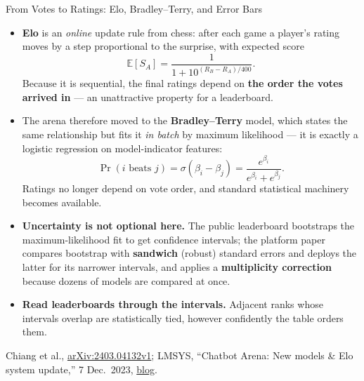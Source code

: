 \begin{frame}{From Votes to Ratings: Elo, Bradley--Terry, and Error Bars}
  \begin{itemize}\footnotesize\itemsep0.3em
    \item[\textcolor{red}{$\blacktriangleright$}] \textbf{Elo} is an \textit{online} update rule from chess: after each game a player's rating moves by a step proportional to the surprise, with expected score
      \[
        \mathbb{E}[S_A] = \frac{1}{1 + 10^{(R_B - R_A)/400}}.
      \]
      Because it is sequential, the final ratings depend on \textbf{the order the votes arrived in} --- an unattractive property for a leaderboard.
    \item[\textcolor{red}{$\blacktriangleright$}] The arena therefore moved to the \textbf{Bradley--Terry} model, which states the same relationship but fits it \textit{in batch} by maximum likelihood --- it is exactly a logistic regression on model-indicator features:
      \[
        \Pr(i \text{ beats } j) = \sigma(\beta_i - \beta_j) = \frac{e^{\beta_i}}{e^{\beta_i} + e^{\beta_j}}.
      \]
      Ratings no longer depend on vote order, and standard statistical machinery becomes available.
    \item[\textcolor{red}{$\blacktriangleright$}] \textbf{Uncertainty is not optional here.} The public leaderboard bootstraps the maximum-likelihood fit to get confidence intervals; the platform paper compares bootstrap with \textbf{sandwich} (robust) standard errors and deploys the latter for its narrower intervals, and applies a \textbf{multiplicity correction} because dozens of models are compared at once.
    \item[\textcolor{red}{$\blacktriangleright$}] \textbf{Read leaderboards through the intervals.} Adjacent ranks whose intervals overlap are statistically tied, however confidently the table orders them.
  \end{itemize}
  \vspace{0.1em}
  {\scriptsize Chiang et al., \href{https://arxiv.org/abs/2403.04132v1}{arXiv:2403.04132v1}; LMSYS, ``Chatbot Arena: New models \& Elo system update,'' 7 Dec.\ 2023, \href{https://www.lmsys.org/blog/2023-12-07-leaderboard/}{blog}.}
\end{frame}

